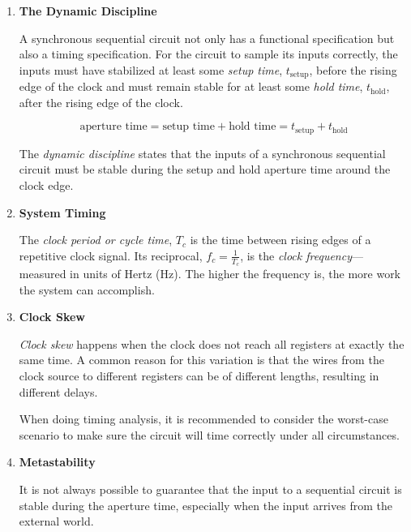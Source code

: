 \documentclass[12pt]{article}
\begin{document}
\begin{enumerate}
  \item \textbf{The Dynamic Discipline}

  A synchronous sequential circuit not only has a functional specification but also a timing specification. For the circuit to sample its inputs correctly, the inputs must have stabilized at least some \textit{setup time}, $t_{\text{setup}}$, before the rising edge of the clock and must remain stable for at least some \textit{hold time}, $t_{\text{hold}}$, after the rising edge of the clock.

  \begin{equation} \label{equation:1}
    \text{aperture time} = \text{setup time} + \text{hold time} = t_{\text{setup}} + t_{\text{hold}}
  \end{equation}

  The \textit{dynamic discipline} states that the inputs of a synchronous sequential circuit must be stable during the setup and hold aperture time around the clock edge.

  \item \textbf{System Timing}

  The \textit{clock period or cycle time}, $T_c$ is the time between rising edges of a repetitive clock signal. Its reciprocal, $f_c = \frac{1}{T_c}$, is the \textit{clock frequency}---measured in units of Hertz (Hz). The higher the frequency is, the more work the system can accomplish.

  \item \textbf{Clock Skew}

  \textit{Clock skew} happens when the clock does not reach all registers at exactly the same time. A common reason for this variation is that the wires from the clock source to different registers can be of different lengths, resulting in different delays.

  When doing timing analysis, it is recommended to consider the worst-case scenario to make sure the circuit will time correctly under all circumstances.

  \item \textbf{Metastability}

  It is not always possible to guarantee that the input to a sequential circuit is stable during the aperture time, especially when the input arrives from the external world.


\end{enumerate}
\end{document}

